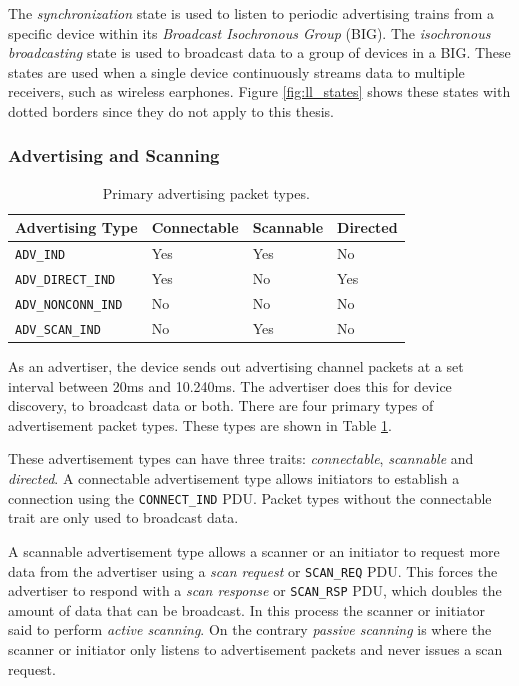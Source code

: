 The \textit{synchronization} state is used to listen to periodic advertising trains from a specific device within its \textit{Broadcast Isochronous Group} (BIG). The \textit{isochronous broadcasting} state is used to broadcast data to a group of devices in a BIG. These states are used when a single device continuously streams data to multiple receivers, such as wireless earphones. Figure \ref{fig:ll_states} shows these states with dotted borders since they do not apply to this thesis.

\subsubsection{Advertising and Scanning}
\begin{table}
    \begin{center}
    \begin{tabular}{|l|l|l|l|}
        \hline
        \textbf{Advertising Type} & \textbf{Connectable} & \textbf{Scannable} & \textbf{Directed} \\
        \hline
        \texttt{ADV\_IND} & Yes & Yes & No \\
        \hline
        \texttt{ADV\_DIRECT\_IND} & Yes & No & Yes \\
        \hline
        \texttt{ADV\_NONCONN\_IND} & No & No & No \\
        \hline
        \texttt{ADV\_SCAN\_IND} & No & Yes & No \\
        \hline
    \end{tabular}
    \end{center}
    \caption{Primary advertising packet types.}
    \label{tbl:adv_types}
\end{table}

As an advertiser, the device sends out advertising channel packets at a set interval between 20ms and 10.240ms. The advertiser does this for device discovery, to broadcast data or both. There are four primary types of advertisement packet types. These types are shown in Table \ref{tbl:adv_types}.

These advertisement types can have three traits: \textit{connectable}, \textit{scannable} and \textit{directed}. A connectable advertisement type allows initiators to establish a connection using the \texttt{CONNECT\_IND} PDU. Packet types without the connectable trait are only used to broadcast data.

A scannable advertisement type allows a scanner or an initiator to request more data from the advertiser using a \textit{scan request} or \texttt{SCAN\_REQ} PDU. This forces the advertiser to respond with a \textit{scan response} or \texttt{SCAN\_RSP} PDU, which doubles the amount of data that can be broadcast. In this process the scanner or initiator said to perform \textit{active scanning}. On the contrary \textit{passive scanning} is where the scanner or initiator only listens to advertisement packets and never issues a scan request.

